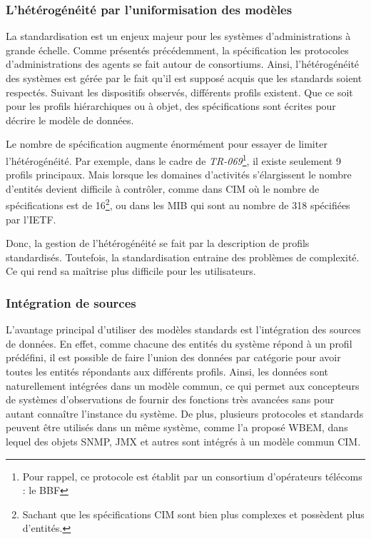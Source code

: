 \subsubsection{L'hétérogénéité par l'uniformisation des modèles}
La standardisation est un enjeux majeur pour les systèmes d'administrations à grande échelle. Comme présentés précédemment, la spécification les protocoles d'administrations des agents se fait autour de consortiums. Ainsi, l'hétérogénéité des systèmes est gérée par le fait qu'il est supposé acquis que les standards soient respectés. Suivant les dispositifs observés, différents profils existent. Que ce soit pour les profils hiérarchiques ou à objet, des spécifications sont écrites pour décrire le modèle de données.

Le nombre de spécification augmente énormément pour essayer de limiter l'hétérogénéité. Par exemple, dans le cadre de \textit{TR-069}\footnote{Pour rappel, ce protocole est établit par un consortium d'opérateurs télécoms : le BBF}, il existe seulement 9 profils principaux. Mais lorsque les domaines d'activités s'élargissent le nombre d'entités devient difficile à contrôler, comme dans CIM où le nombre de spécifications est de 16\footnote{Sachant que les spécifications CIM sont bien plus complexes et possèdent plus d'entités.}, ou dans les MIB qui sont au nombre de 318 spécifiées par l'IETF.

Donc, la gestion de l'hétérogénéité se fait par la description de profils standardisés. Toutefois, la standardisation entraine des problèmes de complexité. Ce qui rend sa maîtrise plus difficile pour les utilisateurs.

\subsubsection{Intégration de sources}
L'avantage principal d'utiliser des modèles standards est l'intégration des sources de données. En effet, comme chacune des entités du système répond à un profil prédéfini, il est possible de faire l'union des données par catégorie pour avoir toutes les entités répondants aux différents profils. Ainsi, les données sont naturellement intégrées dans un modèle commun, ce qui permet aux concepteurs de systèmes d'observations de fournir des fonctions très avancées sans pour autant connaître l'instance du système. De plus, plusieurs protocoles et standards peuvent être utilisés dans un même système, comme l'a proposé WBEM, dans lequel des objets SNMP, JMX et autres sont intégrés à un modèle commun CIM.

